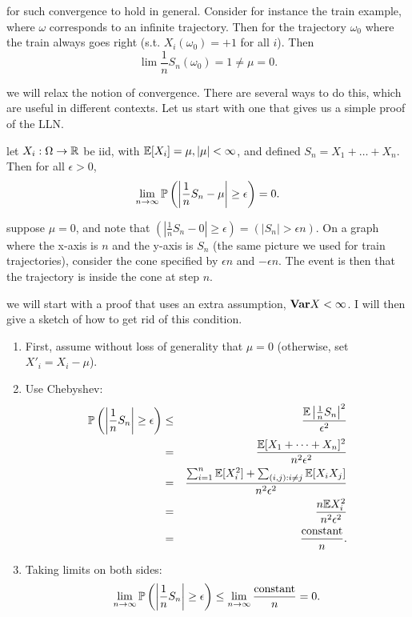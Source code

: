 \documentclass{article}
\begin{document}
 for such convergence to hold in general. Consider for instance the train example, where $\omega$ corresponds to an infinite trajectory. Then for the trajectory $\omega_0$ where the train always goes right (s.t. $X_i(\omega_0) = +1$ for all $i$). Then \[ \lim \frac{1}{n} S_n(\omega_0) = 1 \neq \mu = 0.\]

 we will relax the notion of convergence. There are several ways to do this, which are useful in different contexts. Let us start with one that gives us a simple proof of the LLN.

 let $X_i : \Omega \to \R$ be iid, with $\E[X_i] = \mu, |\mu| < \infty$, and defined $S_n = X_1 + \dots + X_n$. Then for all $\epsilon > 0$, \[ \lim_{n\to\infty} \P\left( \left| \frac{1}{n} S_n - \mu\right| \ge \epsilon \right) = 0. \]

 suppose $\mu = 0$, and note that $\left( \left| \frac{1}{n} S_n -0\right| \ge \epsilon \right) = ( |S_n| > \epsilon n)$. On a graph where the x-axis is $n$ and the y-axis is $S_n$ (the same picture we used for train trajectories), consider the cone specified by $\epsilon n$ and $-\epsilon n$. The event is then that the trajectory is inside the cone at step $n$.

 we will start with a proof that uses an extra assumption, $\var X < \infty$. I will then give a sketch of how to get rid of this condition.
\begin{enumerate}
  \item First, assume without loss of generality that $\mu = 0$ (otherwise, set $X'_i = X_i - \mu$). 
  \item Use Chebyshev:
  \begin{eqnarray*}
    \P\left(\left|\frac{1}{n}S_n\right| \ge \epsilon \right) &\le& \frac{\E\left| \frac{1}{n} S_n \right|^2}{\epsilon^2} \\
    &=& \frac{\E[X_1 + \dots + X_n]^2}{n^2 \epsilon^2} \\
    &=& \frac{\sum_{i=1}^n \E[X_i^2] + \sum_{(i,j):i\neq j} \E[X_i X_j]}{n^2 \epsilon^2} \\
    &=& \frac{n \E X_i^2}{n^2 \epsilon^2} \\
    &=& \frac{\text{constant}}{n}.
  \end{eqnarray*}
  \item Taking limits on both sides: \[ \lim_{n\to\infty} \P\left(\left|\frac{1}{n}S_n\right| \ge \epsilon \right) \le \lim_{n\to\infty} \frac{\text{constant}}{n} = 0. \]
\end{enumerate}
\end{document}
